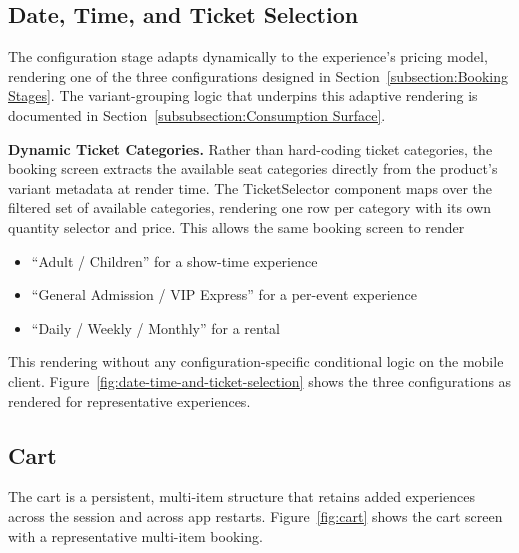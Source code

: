 
\subsection{Date, Time, and Ticket Selection}
The configuration stage adapts dynamically to the experience's pricing model, rendering one of the three configurations designed in Section~\ref{subsection:Booking Stages}. The variant-grouping logic that underpins this adaptive rendering is documented in Section~\ref{subsubsection:Consumption Surface}.

\textbf{Dynamic Ticket Categories.} Rather than hard-coding ticket categories, the booking screen extracts the available seat categories directly from the product's variant metadata at render time. The TicketSelector component maps over the filtered set of available categories, rendering one row per category with its own quantity selector and price. This allows the same booking screen to render 

\begin{itemize}
  \item ``Adult / Children'' for a show-time experience
  \item ``General Admission / VIP Express'' for a per-event experience
  \item ``Daily / Weekly / Monthly'' for a rental 
\end{itemize}
This rendering without any configuration-specific conditional logic on the mobile client. Figure~\ref{fig:date-time-and-ticket-selection} shows the three configurations as rendered for representative experiences.

\subsection{Cart}
\label{subsection:Cart}
The cart is a persistent, multi-item structure that retains added experiences across the session and across app restarts. Figure~\ref{fig:cart} shows the cart screen with a representative multi-item booking.

